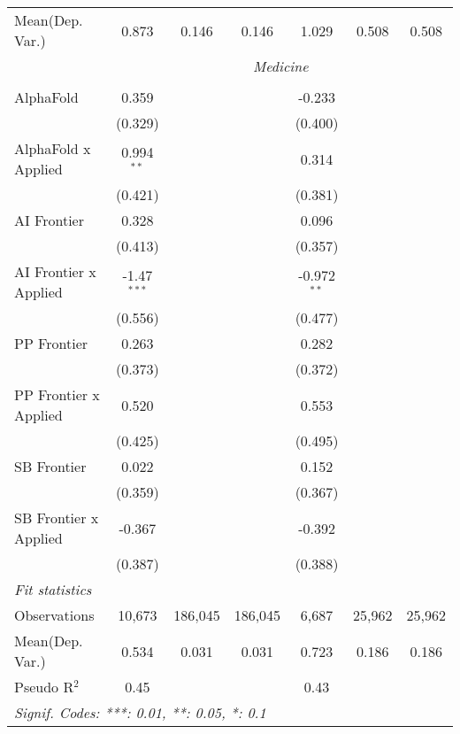 \begin{tabular}{lcccccc}
Mean(Dep. Var.) & 0.873 & 0.146 & 0.146 & 1.029 & 0.508 & 0.508 \\
 & \multicolumn{6}{c}{\textit{Medicine}} \\ \\
   AlphaFold             & 0.359         &         &         & -0.233        &        &   \\   
                         & (0.329)       &         &         & (0.400)       &        &   \\   
   AlphaFold x Applied   & 0.994$^{**}$  &         &         & 0.314         &        &   \\   
                         & (0.421)       &         &         & (0.381)       &        &   \\   
   AI Frontier           & 0.328         &         &         & 0.096         &        &   \\   
                         & (0.413)       &         &         & (0.357)       &        &   \\   
   AI Frontier x Applied & -1.47$^{***}$ &         &         & -0.972$^{**}$ &        &   \\   
                         & (0.556)       &         &         & (0.477)       &        &   \\   
   PP Frontier           & 0.263         &         &         & 0.282         &        &   \\   
                         & (0.373)       &         &         & (0.372)       &        &   \\   
   PP Frontier x Applied & 0.520         &         &         & 0.553         &        &   \\   
                         & (0.425)       &         &         & (0.495)       &        &   \\   
   SB Frontier           & 0.022         &         &         & 0.152         &        &   \\   
                         & (0.359)       &         &         & (0.367)       &        &   \\   
   SB Frontier x Applied & -0.367        &         &         & -0.392        &        &   \\   
                         & (0.387)       &         &         & (0.388)       &        &   \\   
   \midrule
   \emph{Fit statistics}\\
   Observations          & 10,673        & 186,045 & 186,045 & 6,687         & 25,962 & 25,962\\  
Mean(Dep. Var.) & 0.534 & 0.031 & 0.031 & 0.723 & 0.186 & 0.186 \\
   Pseudo R$^2$          & 0.45          &         &         & 0.43          &        & \\  
   \midrule \midrule
   \multicolumn{7}{l}{\emph{Signif. Codes: ***: 0.01, **: 0.05, *: 0.1}}\\
\end{tabular}
\par\endgroup
